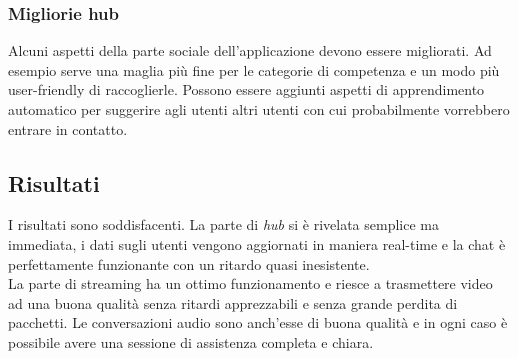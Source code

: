 \documentclass[conference]{IEEEtran}
\begin{document}
		\subsubsection{Migliorie hub}
			Alcuni aspetti della parte sociale dell'applicazione devono essere migliorati. Ad esempio serve
			una maglia più fine per le categorie di competenza e un modo più user-friendly di raccoglierle.
			Possono essere aggiunti aspetti di apprendimento automatico per suggerire agli utenti altri
			utenti con cui probabilmente vorrebbero entrare in contatto.

	\subsection{Risultati}
		I risultati sono soddisfacenti. La parte di \textit{hub} si è rivelata semplice ma immediata, i dati sugli 
		utenti vengono aggiornati in maniera real-time e la chat è perfettamente funzionante con un ritardo quasi
		inesistente.\\
		La parte di streaming ha un ottimo funzionamento e riesce a trasmettere video ad una buona qualità senza
		ritardi apprezzabili e senza grande perdita di pacchetti. Le conversazioni audio sono anch'esse di buona
		qualità e in ogni caso è possibile avere una sessione di assistenza completa e chiara.
	




%
%
\end{document}
